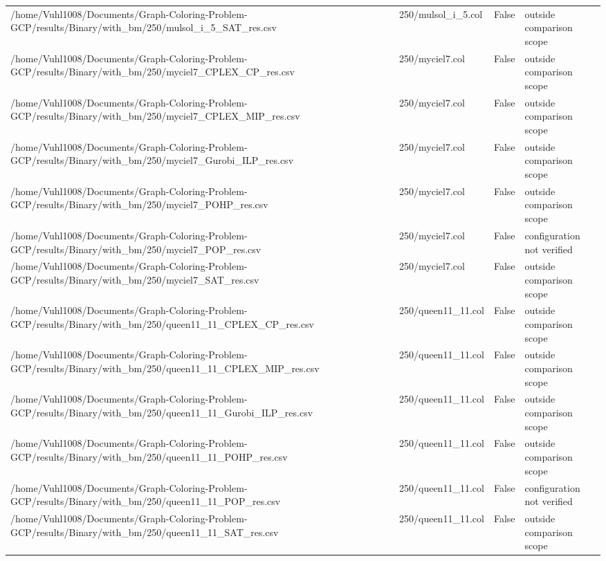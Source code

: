 \begin{table}[htbp]
\begin{tabular}{llll}
/home/Vuhl1008/Documents/Graph-Coloring-Problem-GCP/results/Binary/with\_bm/250/mulsol\_i\_5\_SAT\_res.csv & 250/mulsol\_i\_5.col & False & outside comparison scope \\
/home/Vuhl1008/Documents/Graph-Coloring-Problem-GCP/results/Binary/with\_bm/250/myciel7\_CPLEX\_CP\_res.csv & 250/myciel7.col & False & outside comparison scope \\
/home/Vuhl1008/Documents/Graph-Coloring-Problem-GCP/results/Binary/with\_bm/250/myciel7\_CPLEX\_MIP\_res.csv & 250/myciel7.col & False & outside comparison scope \\
/home/Vuhl1008/Documents/Graph-Coloring-Problem-GCP/results/Binary/with\_bm/250/myciel7\_Gurobi\_ILP\_res.csv & 250/myciel7.col & False & outside comparison scope \\
/home/Vuhl1008/Documents/Graph-Coloring-Problem-GCP/results/Binary/with\_bm/250/myciel7\_POHP\_res.csv & 250/myciel7.col & False & outside comparison scope \\
/home/Vuhl1008/Documents/Graph-Coloring-Problem-GCP/results/Binary/with\_bm/250/myciel7\_POP\_res.csv & 250/myciel7.col & False & configuration not verified \\
/home/Vuhl1008/Documents/Graph-Coloring-Problem-GCP/results/Binary/with\_bm/250/myciel7\_SAT\_res.csv & 250/myciel7.col & False & outside comparison scope \\
/home/Vuhl1008/Documents/Graph-Coloring-Problem-GCP/results/Binary/with\_bm/250/queen11\_11\_CPLEX\_CP\_res.csv & 250/queen11\_11.col & False & outside comparison scope \\
/home/Vuhl1008/Documents/Graph-Coloring-Problem-GCP/results/Binary/with\_bm/250/queen11\_11\_CPLEX\_MIP\_res.csv & 250/queen11\_11.col & False & outside comparison scope \\
/home/Vuhl1008/Documents/Graph-Coloring-Problem-GCP/results/Binary/with\_bm/250/queen11\_11\_Gurobi\_ILP\_res.csv & 250/queen11\_11.col & False & outside comparison scope \\
/home/Vuhl1008/Documents/Graph-Coloring-Problem-GCP/results/Binary/with\_bm/250/queen11\_11\_POHP\_res.csv & 250/queen11\_11.col & False & outside comparison scope \\
/home/Vuhl1008/Documents/Graph-Coloring-Problem-GCP/results/Binary/with\_bm/250/queen11\_11\_POP\_res.csv & 250/queen11\_11.col & False & configuration not verified \\
/home/Vuhl1008/Documents/Graph-Coloring-Problem-GCP/results/Binary/with\_bm/250/queen11\_11\_SAT\_res.csv & 250/queen11\_11.col & False & outside comparison scope \\

\end{tabular}
\end{table}
